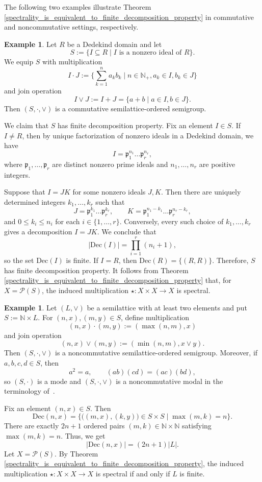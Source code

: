 \documentclass[10pt, reqno]{amsart}
\theoremstyle{plain}
\theoremstyle{definition}
\newtheorem{example}[theorem]{Example}
\begin{document}
The following two examples illustrate Theorem \ref{spectrality_is_equivalent_to_finite_decomposition_property} in commutative and noncommutative settings, respectively. 
\begin{example}
Let $R$ be a Dedekind domain and let $$S := \{I \subseteq R \mid I\text{ is a nonzero ideal of } R\}.$$ We equip $S$ with multiplication $$I\cdot J := \bigg\{\sum_{k = 1}^n a_kb_k \mid n\in\mathbb{N}_+, a_k\in I, b_k\in J\bigg\}$$ and join operation $$I \lor J := I + J = \{a + b \mid a \in I, b\in J\}.$$ Then $(S, \cdot, \lor)$ is a commutative semilattice-ordered semigroup. 

We claim that $S$ has finite decomposition property. Fix an element $I \in S$. If $I \neq R$, then by unique factorization of nonzero ideals in a Dedekind domain, we have $$I = \mathfrak{p}_1^{n_1}\ldots\mathfrak{p}_r^{n_r},$$ where $\mathfrak{p}_1, \ldots, \mathfrak{p}_r$ are distinct nonzero prime ideals and $n_1, \ldots, n_r$ are positive integers. 

Suppose that $I = JK$ for some nonzero ideals $J, K$. Then there are uniquely determined integers $k_1, \ldots, k_r$ such that $$J = \mathfrak{p}_1^{k_1} \ldots\mathfrak{p}_r^{k_r},\qquad K = \mathfrak{p}_1^{n_1 - k_1}\ldots\mathfrak{p}_r^{n_r - k_r},$$ and $0 \leqslant k_i \leqslant n_i$ for each $i\in\{1, \ldots, r\}$. Conversely, every such choice of $k_1, \ldots, k_r$ gives a decomposition $I = JK$. We conclude that $$|\mathrm{Dec}(I)| = \prod_{i = 1}^r (n_i + 1),$$ so the set $\mathrm{Dec}(I)$ is finite. If $I = R$, then $\mathrm{Dec}(R) = \{(R, R)\}$. Therefore, $S$ has finite decomposition property. It follows from Theorem \ref{spectrality_is_equivalent_to_finite_decomposition_property} that, for $X = \mathcal{P}(S)$, the induced multiplication $\star: X \times X \to X$ is spectral. 
\end{example}
\begin{example}
Let $(L, \lor)$ be a semilattice with at least two elements and put $S := \mathbb{N}\times L$. For $(n, x), (m, y) \in S$, define multiplication $$(n, x) \cdot (m, y) := (\max(n, m), x)$$ and join operation $$(n, x) \lor (m, y) := (\min(n, m), x\lor y).$$ Then $(S, \cdot, \lor)$ is a noncommutative semilattice-ordered semigroup. Moreover, if $a, b, c, d \in S$, then $$a^2 = a, \qquad (ab)(cd) = (ac)(bd),$$ so $(S, \cdot)$ is a mode and $(S, \cdot, \lor)$ is a noncommutative modal in the terminology of~\cite{PilitowskaZamojskaDzienio}.

Fix an element $(n, x)\in S$. Then $$\mathrm{Dec}(n , x) = \big\{\big((m, x), (k, y)\big)\in S \times S\mid\max(m, k) = n\big\}.$$ There are exactly $2n + 1$ ordered pairs $(m, k)\in\mathbb{N} \times \mathbb{N}$ satisfying $\max(m, k) = n$. Thus, we get $$|\mathrm{Dec}(n, x)| = (2n + 1)|L|.$$ Let $X = \mathcal{P}(S)$. By Theorem \ref{spectrality_is_equivalent_to_finite_decomposition_property}, the induced multiplication $\star: X \times X \to X$ is spectral if and only if $L$ is finite. 
\end{example}
\end{document}
